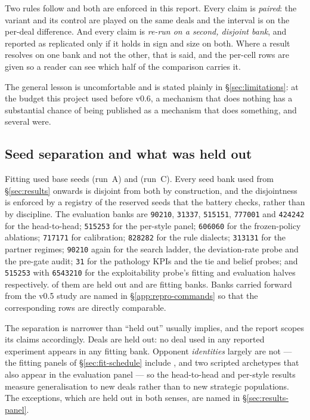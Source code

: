 Two rules follow and both are enforced in this report. Every claim is
\emph{paired}: the variant and its control are played on the same deals and the
interval is on the per-deal difference. And every claim is \emph{re-run on a
second, disjoint bank}, and reported as replicated only if it holds in sign and
size on both. Where a result resolves on one bank and not the other, that is
said, and the per-cell rows are given so a reader can see which half of the
comparison carries it.

The general lesson is uncomfortable and is stated plainly in
\S\ref{sec:limitations}: at the budget this project used before v0.6, a
mechanism that does nothing has a substantial chance of being published as a
mechanism that does something, and several were.

\subsection{Seed separation and what was held out}
\label{sec:protocol-seeds}

Fitting used base seeds \vsixFitASeed{} (run~A) and \vsixFitCSeed{} (run~C).
Every seed bank used from \S\ref{sec:results} onwards is disjoint from both by
construction, and the disjointness is enforced by a registry of the
\vsixReservedSeeds{} reserved seeds that the battery checks, rather than by
discipline. The evaluation banks are \texttt{90210}, \texttt{31337},
\texttt{515151}, \texttt{777001} and \texttt{424242} for the head-to-head;
\texttt{515253} for the per-style panel; \texttt{606060} for the frozen-policy
ablations; \texttt{717171} for calibration; \texttt{828282} for the rule
dialects; \texttt{313131} for the partner regimes; \texttt{90210} again for the
search ladder, the deviation-rate probe and the pre-gate audit; \texttt{31} for
the pathology KPIs and the tie and belief probes; and \texttt{515253} with
\texttt{6543210} for the exploitability probe's fitting and evaluation halves
respectively. \vsixHeldOutBanks{} of them are held out and \vsixFitBanks{} are
fitting banks. Banks carried forward from the v0.5 study are named in
\S\ref{app:repro-commands} so that the corresponding rows are directly
comparable.

The separation is narrower than ``held out'' usually implies, and the report
scopes its claims accordingly. Deals are held out: no deal used in any reported
experiment appears in any fitting bank. Opponent \emph{identities} largely are
not --- the fitting panels of \S\ref{sec:fit-schedule} include \vfive{},
\vthree{} and two scripted archetypes that also appear in the evaluation panel
--- so the head-to-head and per-style results measure generalisation to new deals
rather than to new strategic populations. The exceptions, which are held out in
both senses, are named in \S\ref{sec:results-panel}.

